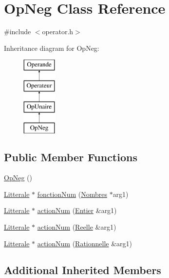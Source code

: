 \hypertarget{class_op_neg}{}\section{Op\+Neg Class Reference}
\label{class_op_neg}


{\ttfamily \#include $<$operator.\+h$>$}

Inheritance diagram for Op\+Neg\+:\begin{figure}[H]
\begin{center}
\leavevmode
\includegraphics[height=4.000000cm]{class_op_neg}
\end{center}
\end{figure}
\subsection*{Public Member Functions}
\begin{DoxyCompactItemize}
\item 
\hyperlink{class_op_neg_a61eb1bf7e525d382980b913da91515aa}{Op\+Neg} ()
\item 
\hyperlink{class_litterale}{Litterale} $\ast$ \hyperlink{class_op_neg_aba05bfb2ea8d1061303c2f98201b42c1}{fonction\+Num} (\hyperlink{class_nombres}{Nombres} $\ast$arg1)
\item 
\hyperlink{class_litterale}{Litterale} $\ast$ \hyperlink{class_op_neg_a716a9d79a42c5d5993bcc7bab10a167e}{action\+Num} (\hyperlink{class_entier}{Entier} \&arg1)
\item 
\hyperlink{class_litterale}{Litterale} $\ast$ \hyperlink{class_op_neg_a18050dc2d64ca60845616b295af9b10c}{action\+Num} (\hyperlink{class_reelle}{Reelle} \&arg1)
\item 
\hyperlink{class_litterale}{Litterale} $\ast$ \hyperlink{class_op_neg_a8801e50e3b9af195d71c3324b2aa4c33}{action\+Num} (\hyperlink{class_rationnelle}{Rationnelle} \&arg1)
\end{DoxyCompactItemize}
\subsection*{Additional Inherited Members}


